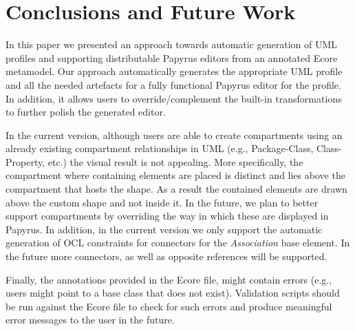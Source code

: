 \section{Conclusions and Future Work}
\label{sec:future}
In this paper we presented an approach towards automatic generation of UML profiles and supporting distributable Papyrus editors from an annotated Ecore metamodel. Our approach automatically generates the appropriate UML profile and all the needed artefacts for a fully functional Papyrus editor for the profile. In addition, it allows users to override/complement the built-in transformations to further polish the generated editor.

In the current version, although users are able to create compartments using an already existing compartment relationships in UML (e.g., Package-Class, Class-Property, etc.) the visual result is not appealing. More specifically, the compartment where containing elements are placed is distinct and lies above the compartment that hosts the shape. As a result the contained elements are drawn above the custom shape and not inside it. In the future, we plan to better support compartments by overriding the way in which these are displayed in Papyrus. In addition, in the current version we only support the automatic generation of OCL constraints for connectors for the \textit{Association} base element. In the future more connectors, as well as opposite references will be supported. 


Finally, the annotations provided in the Ecore file, might contain errors (e.g., users might point to a base class that does not exist). Validation scripts should be run against the Ecore file to check for such errors and produce meaningful error messages to the user in the future.